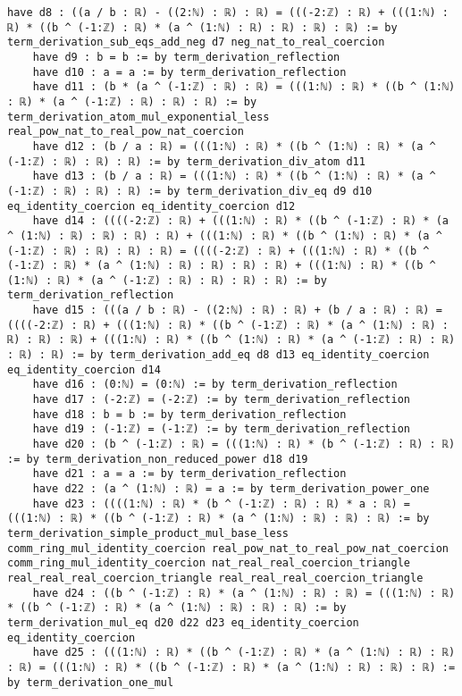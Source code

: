 \documentclass{article}
\begin{document}
\begin{tcolorbox}[colback=white!10, width=\linewidth]
\begin{lstlisting}[language=Lean4]
    have d8 : ((a / b : ℝ) - ((2:ℕ) : ℝ) : ℝ) = (((-2:ℤ) : ℝ) + (((1:ℕ) : ℝ) * ((b ^ (-1:ℤ) : ℝ) * (a ^ (1:ℕ) : ℝ) : ℝ) : ℝ) : ℝ) := by term_derivation_sub_eqs_add_neg d7 neg_nat_to_real_coercion
    have d9 : b = b := by term_derivation_reflection
    have d10 : a = a := by term_derivation_reflection
    have d11 : (b * (a ^ (-1:ℤ) : ℝ) : ℝ) = (((1:ℕ) : ℝ) * ((b ^ (1:ℕ) : ℝ) * (a ^ (-1:ℤ) : ℝ) : ℝ) : ℝ) := by term_derivation_atom_mul_exponential_less real_pow_nat_to_real_pow_nat_coercion
    have d12 : (b / a : ℝ) = (((1:ℕ) : ℝ) * ((b ^ (1:ℕ) : ℝ) * (a ^ (-1:ℤ) : ℝ) : ℝ) : ℝ) := by term_derivation_div_atom d11
    have d13 : (b / a : ℝ) = (((1:ℕ) : ℝ) * ((b ^ (1:ℕ) : ℝ) * (a ^ (-1:ℤ) : ℝ) : ℝ) : ℝ) := by term_derivation_div_eq d9 d10 eq_identity_coercion eq_identity_coercion d12
    have d14 : ((((-2:ℤ) : ℝ) + (((1:ℕ) : ℝ) * ((b ^ (-1:ℤ) : ℝ) * (a ^ (1:ℕ) : ℝ) : ℝ) : ℝ) : ℝ) + (((1:ℕ) : ℝ) * ((b ^ (1:ℕ) : ℝ) * (a ^ (-1:ℤ) : ℝ) : ℝ) : ℝ) : ℝ) = ((((-2:ℤ) : ℝ) + (((1:ℕ) : ℝ) * ((b ^ (-1:ℤ) : ℝ) * (a ^ (1:ℕ) : ℝ) : ℝ) : ℝ) : ℝ) + (((1:ℕ) : ℝ) * ((b ^ (1:ℕ) : ℝ) * (a ^ (-1:ℤ) : ℝ) : ℝ) : ℝ) : ℝ) := by term_derivation_reflection
    have d15 : (((a / b : ℝ) - ((2:ℕ) : ℝ) : ℝ) + (b / a : ℝ) : ℝ) = ((((-2:ℤ) : ℝ) + (((1:ℕ) : ℝ) * ((b ^ (-1:ℤ) : ℝ) * (a ^ (1:ℕ) : ℝ) : ℝ) : ℝ) : ℝ) + (((1:ℕ) : ℝ) * ((b ^ (1:ℕ) : ℝ) * (a ^ (-1:ℤ) : ℝ) : ℝ) : ℝ) : ℝ) := by term_derivation_add_eq d8 d13 eq_identity_coercion eq_identity_coercion d14
    have d16 : (0:ℕ) = (0:ℕ) := by term_derivation_reflection
    have d17 : (-2:ℤ) = (-2:ℤ) := by term_derivation_reflection
    have d18 : b = b := by term_derivation_reflection
    have d19 : (-1:ℤ) = (-1:ℤ) := by term_derivation_reflection
    have d20 : (b ^ (-1:ℤ) : ℝ) = (((1:ℕ) : ℝ) * (b ^ (-1:ℤ) : ℝ) : ℝ) := by term_derivation_non_reduced_power d18 d19
    have d21 : a = a := by term_derivation_reflection
    have d22 : (a ^ (1:ℕ) : ℝ) = a := by term_derivation_power_one
    have d23 : ((((1:ℕ) : ℝ) * (b ^ (-1:ℤ) : ℝ) : ℝ) * a : ℝ) = (((1:ℕ) : ℝ) * ((b ^ (-1:ℤ) : ℝ) * (a ^ (1:ℕ) : ℝ) : ℝ) : ℝ) := by term_derivation_simple_product_mul_base_less comm_ring_mul_identity_coercion real_pow_nat_to_real_pow_nat_coercion comm_ring_mul_identity_coercion nat_real_real_coercion_triangle real_real_real_coercion_triangle real_real_real_coercion_triangle
    have d24 : ((b ^ (-1:ℤ) : ℝ) * (a ^ (1:ℕ) : ℝ) : ℝ) = (((1:ℕ) : ℝ) * ((b ^ (-1:ℤ) : ℝ) * (a ^ (1:ℕ) : ℝ) : ℝ) : ℝ) := by term_derivation_mul_eq d20 d22 d23 eq_identity_coercion eq_identity_coercion
    have d25 : (((1:ℕ) : ℝ) * ((b ^ (-1:ℤ) : ℝ) * (a ^ (1:ℕ) : ℝ) : ℝ) : ℝ) = (((1:ℕ) : ℝ) * ((b ^ (-1:ℤ) : ℝ) * (a ^ (1:ℕ) : ℝ) : ℝ) : ℝ) := by term_derivation_one_mul

\end{lstlisting}
\end{tcolorbox}
\end{document}
